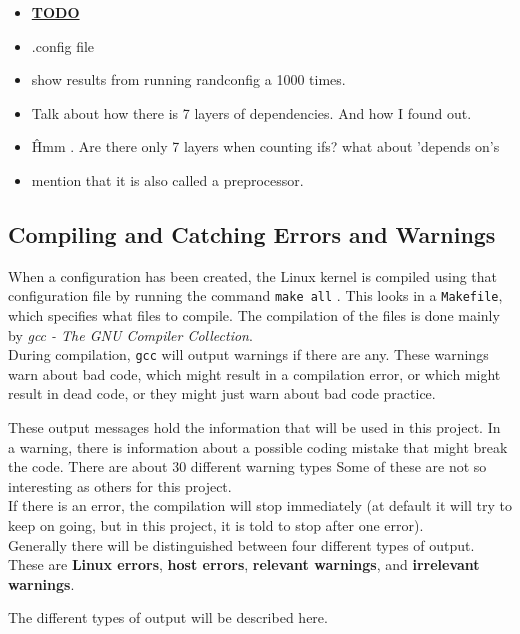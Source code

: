 \documentclass[a4paper,11pt]{report}
\newcommand{\textcode}[1]{
    \fboxsep=1pt
    \texttt{\colorbox{gray!20}{#1}}
}
\begin{document}
\begin{itemize}
    \item \underline{\textbf{TODO}}
    \item .config file
    \item show results from running randconfig a 1000 times.
    \item Talk about how there is 7 layers of dependencies. And how I found out.
    \item \^ Hmm . Are there only 7 layers when counting ifs? what about 
        'depends on's
    \item mention that it is also called a preprocessor.
\end{itemize}


\subsection{Compiling and Catching Errors and Warnings}

When a configuration has been created, the Linux kernel is compiled using 
that configuration file by running the command \textcode{make all}. This looks 
in a \texttt{Makefile}, which specifies what files to compile. The compilation 
of the files is done mainly by \emph{gcc - The GNU Compiler Collection}.
\\

During compilation, \texttt{gcc} will output warnings if there are any. These 
warnings warn about bad code, which might result in a compilation error, or 
which might result in dead code, or they might just warn about bad code 
practice.

These output messages hold the information that will be used in this project. 
In a warning, there is information about a possible coding mistake that might 
break the code. There are about 30 different warning types \cite{gccwarnings}
Some of these are not so interesting as others for this project.
\\

If there is an error, the compilation will stop immediately 
(at default it will try to keep on going, but in this project, it is told to 
stop after one error).
\\

Generally there will be distinguished between four different types of output. 
These are \textbf{Linux errors}, \textbf{host errors}, 
\textbf{relevant warnings}, and \textbf{irrelevant warnings}. 

The different types of output will be described here.
\end{document}
